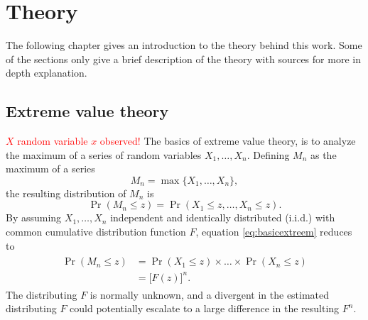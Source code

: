 \chapter[Theory]{Theory}
The following chapter gives an introduction to the theory behind this work. Some of the sections only give a brief description of the theory with sources for more in depth explanation. %
\section{Extreme value theory}
\label{ch:extemevalthe}
\textcolor{red}{$X$ random variable $x$ observed!}
The basics of extreme value theory, is to analyze the maximum of a series of random variables $X_1,\dots,X_n$.
Defining $M_n$ as the maximum of a series
\begin{equation}
M_n=\max\{X_1,\dots,X_n\},
\end{equation}
%
the resulting distribution of $M_n$ is
\begin{equation}
\label{eq:basicextreem}
\Pr(M_n \leq z)=\Pr(X_1 \leq z,\dots, X_n \leq z).
\end{equation}
By assuming $X_1,\dots,X_n$ independent and identically distributed (i.i.d.) with common cumulative distribution function $F$, equation \eqref{eq:basicextreem} reduces to
\begin{align}
\begin{split}
\label{eq:basicextreemiid}
    \Pr(M_n \leq z)&=\Pr(X_1 \leq z)\times \dots \times \Pr(X_n \leq z)\\
    &=\big[F(z)\big]^n.   
\end{split}
\end{align}
The distributing $F$ is normally unknown, and a divergent in the estimated distributing $F$ could potentially escalate to a large difference in the resulting $F^n$. 

